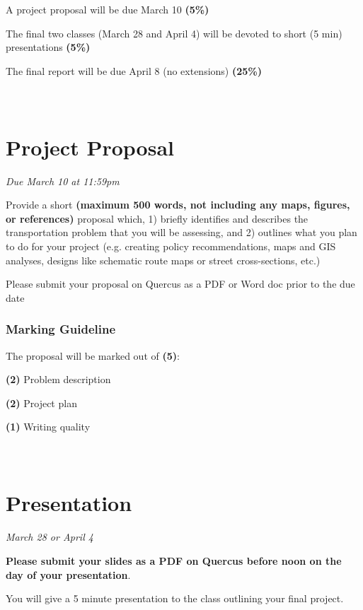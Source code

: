 \documentclass[11pt]{article}
\begin{document}
	A project proposal will be due March 10 \textbf{(5\%)}
	
	The final two classes (March 28 and April 4) will be devoted to short (5 min) presentations \textbf{(5\%)}
	
	The final report will be due April 8 (no extensions) \textbf{(25\%)}
	
	
	\newpage
	
	
	
	
	
	
	\section*{\\Project Proposal}
	
	\textit{Due March 10 at 11:59pm}
	
	Provide a short \textbf{(maximum 500 words, not including any maps, figures, or references)} proposal which, 1) briefly identifies and describes the transportation problem that you will be assessing, and 2) outlines what you plan to do for your project (e.g. creating policy recommendations, maps and GIS analyses, designs like schematic route maps or street cross-sections, etc.)
	
	Please submit your proposal on Quercus as a PDF or Word doc prior to the due date

	\subsubsection*{Marking Guideline}
	
	The proposal will be marked out of \textbf{(5)}:
	
	\textbf{(2)} Problem description
	
	\textbf{(2)} Project plan
	
	\textbf{(1)} Writing quality



	\newpage
	
	
	
	\section*{\\Presentation}
	
	\textit{March 28 or April 4}
	
	\textbf{Please submit your slides as a PDF on Quercus before noon on the day of your presentation}.
	
	You will give a 5 minute presentation to the class outlining your final project.
	
\end{document}
